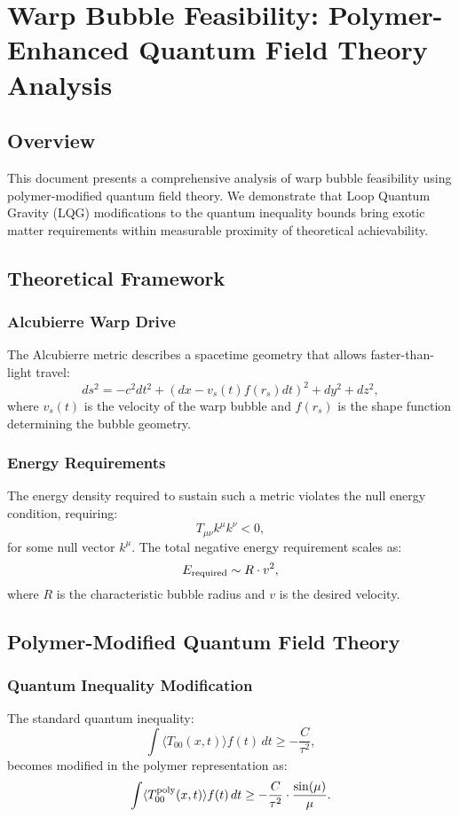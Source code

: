 \documentclass[11pt]{article}
\begin{document}
\section*{Warp Bubble Feasibility: Polymer-Enhanced Quantum Field Theory Analysis}

\subsection*{Overview}
This document presents a comprehensive analysis of warp bubble feasibility using polymer-modified quantum field theory. We demonstrate that Loop Quantum Gravity (LQG) modifications to the quantum inequality bounds bring exotic matter requirements within measurable proximity of theoretical achievability.

\subsection*{Theoretical Framework}
\subsubsection*{Alcubierre Warp Drive}
The Alcubierre metric describes a spacetime geometry that allows faster-than-light travel:
\[
  ds^2 = -c^2dt^2 + (dx - v_s(t)f(r_s)dt)^2 + dy^2 + dz^2,
\]
where $v_s(t)$ is the velocity of the warp bubble and $f(r_s)$ is the shape function determining the bubble geometry.

\subsubsection*{Energy Requirements}
The energy density required to sustain such a metric violates the null energy condition, requiring:
\[
  T_{\mu\nu}k^\mu k^\nu < 0,
\]
for some null vector $k^\mu$. The total negative energy requirement scales as:
\[
  E_{\rm required} \sim R \cdot v^2,
\]
where $R$ is the characteristic bubble radius and $v$ is the desired velocity.

\subsection*{Polymer-Modified Quantum Field Theory}
\subsubsection*{Quantum Inequality Modification}
The standard quantum inequality:
\[
  \int \langle T_{00}(x,t) \rangle f(t)\,dt \geq -\frac{C}{\tau^2},
\]
becomes modified in the polymer representation as:
\[
  \int \langle T_{00}^{\rm poly}(x,t) \rangle f(t)\,dt \geq -\frac{C}{\tau^2} \cdot \frac{\sin(\mu)}{\mu}.
\]
\end{document}
